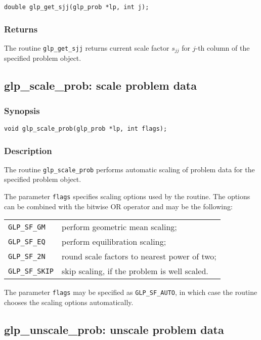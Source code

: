 \begin{verbatim}
double glp_get_sjj(glp_prob *lp, int j);
\end{verbatim}

\subsubsection*{Returns}

The routine \verb|glp_get_sjj| returns current scale factor $s_{jj}$ for
$j$-th column of the specified problem object.

\subsection{glp\_scale\_prob: scale problem data}

\subsubsection*{Synopsis}

\begin{verbatim}
void glp_scale_prob(glp_prob *lp, int flags);
\end{verbatim}

\subsubsection*{Description}

The routine \verb|glp_scale_prob| performs automatic scaling of problem
data for the specified problem object.

The parameter \verb|flags| specifies scaling options used by the
routine. The options can be combined with the bitwise OR operator and
may be the following:

\begin{tabular}{@{}ll}
\verb|GLP_SF_GM| & perform geometric mean scaling;\\
\verb|GLP_SF_EQ| & perform equilibration scaling;\\
\verb|GLP_SF_2N| & round scale factors to nearest power of two;\\
\verb|GLP_SF_SKIP| & skip scaling, if the problem is well scaled.\\
\end{tabular}

The parameter \verb|flags| may be specified as \verb|GLP_SF_AUTO|, in
which case the routine chooses the scaling options automatically.

\subsection{glp\_unscale\_prob: unscale problem data}


